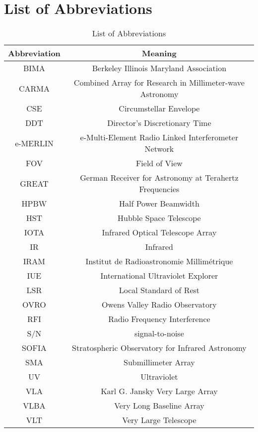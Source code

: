 
\chapter{List of Abbreviations}
\label{app:1}

\begin{table}[!hbt]
\begin{center}
\caption[List of Abbreviations]
{List of Abbreviations}
\begin{tabular}{cc}
\hline
\hline
\rule{0pt}{2.5ex}Abbreviation & Meaning\\
\hline
BIMA & Berkeley Illinois Maryland Association \\
CARMA & Combined Array for Research in Millimeter-wave Astronomy \\
CSE & Circumstellar Envelope \\
DDT & Director's Discretionary Time \\
e-MERLIN &  e-Multi-Element Radio Linked Interferometer Network \\
FOV & Field of View \\
GREAT & German Receiver for Astronomy at Terahertz Frequencies\\
HPBW & Half Power Beamwidth \\
HST & Hubble Space Telescope \\
IOTA & Infrared Optical Telescope Array\\
IR & Infrared \\
IRAM & Institut de Radioastronomie Millim\'etrique \\
IUE & International Ultraviolet Explorer \\
LSR & Local Standard of Rest \\
OVRO & Owens Valley Radio Observatory \\
RFI & Radio Frequency Interference \\
S/N & signal-to-noise\\
SOFIA & Stratospheric Observatory for Infrared Astronomy\\
SMA & Submillimeter Array \\
UV & Ultraviolet \\
VLA & Karl G. Jansky Very Large Array \\
VLBA & Very Long Baseline Array \\
VLT & Very Large Telescope \\

\hline
\end{tabular}
\label{tab:6.4.1}
\end{center}
\end{table}


